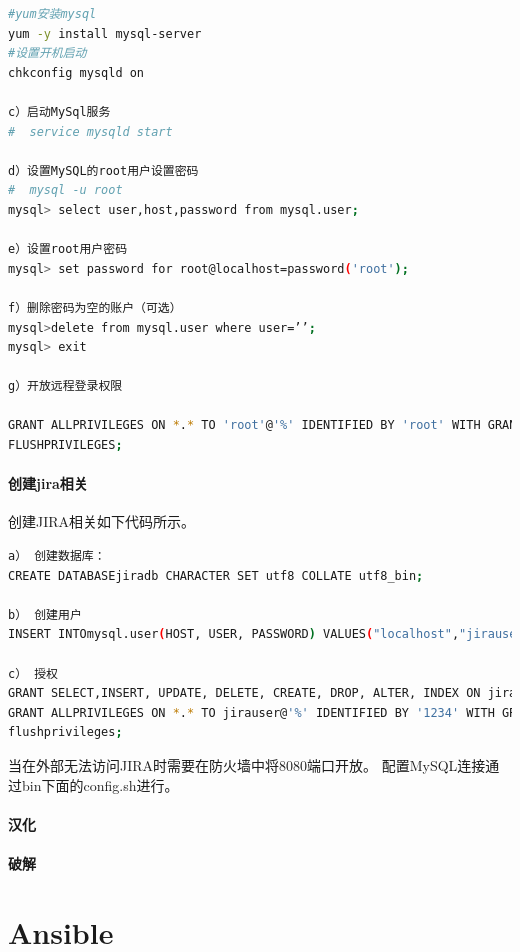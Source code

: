 \documentclass{book}
\begin{document}
\begin{lstlisting}[language=Bash]
#yum安装mysql
yum -y install mysql-server
#设置开机启动
chkconfig mysqld on

c）启动MySql服务
#  service mysqld start

d）设置MySQL的root用户设置密码
#  mysql -u root
mysql> select user,host,password from mysql.user;

e）设置root用户密码
mysql> set password for root@localhost=password('root');

f）删除密码为空的账户（可选）
mysql>delete from mysql.user where user=’’;
mysql> exit

g）开放远程登录权限

GRANT ALLPRIVILEGES ON *.* TO 'root'@'%' IDENTIFIED BY 'root' WITH GRANT OPTION;
FLUSHPRIVILEGES;
\end{lstlisting}

\paragraph{创建jira相关}创建JIRA相关如下代码所示。

\begin{lstlisting}[language=Bash]
a） 创建数据库：
CREATE DATABASEjiradb CHARACTER SET utf8 COLLATE utf8_bin;

b） 创建用户
INSERT INTOmysql.user(HOST, USER, PASSWORD) VALUES("localhost","jirauser", PASSWORD("1234"));

c） 授权
GRANT SELECT,INSERT, UPDATE, DELETE, CREATE, DROP, ALTER, INDEX ON jiradb.* TO'jirauser'@'localhost' IDENTIFIED BY '1234';
GRANT ALLPRIVILEGES ON *.* TO jirauser@'%' IDENTIFIED BY '1234' WITH GRANT OPTION;
flushprivileges;
\end{lstlisting}

当在外部无法访问JIRA时需要在防火墙中将8080端口开放。
配置MySQL连接通过bin下面的config.sh进行。


\paragraph{汉化}

\paragraph{破解}

\section{Ansible}
\end{document}
